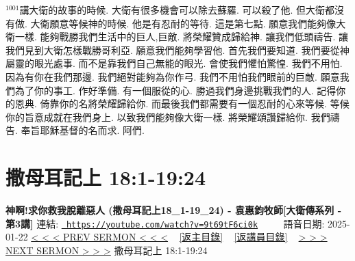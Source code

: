 \documentclass{book}
\begin{document}
$^{1001}$講大衛的故事的時候.
大衛有很多機會可以除去蘇羅.
可以殺了他.
但大衛都沒有做.
大衛願意等候神的時候.
他是有忍耐的等待.
這是第七點.
願意我們能夠像大衛一樣.
能夠戰勝我們生活中的巨人,巨敵.
將榮耀贊成歸給神.
讓我們低頭禱告.
讓我們見到大衛怎樣戰勝哥利亞.
願意我們能夠學習他.
首先我們要知道.
我們要從神屬靈的眼光處事.
而不是靠我們自己無能的眼光.
會使我們懼怕驚惶.
我們不用怕.
因為有你在我們那邊.
我們絕對能夠為你作弓.
我們不用怕我們眼前的巨敵.
願意我們為了你的事工.
作好準備.
有一個服從的心.
勝過我們身邊挑戰我們的人.
記得你的恩典.
倚靠你的名將榮耀歸給你.
而最後我們都需要有一個忍耐的心來等候.
等候你的旨意成就在我們身上.
以致我們能夠像大衛一樣.
將榮耀頌讚歸給你.
我們禱告.
奉旨耶穌基督的名而求.
阿們.
\newpage



\section{撒母耳記上 18:1-19:24}
\label{sec:9t69tF6ci0k}
\textbf{神啊!求你救我脫離惡人 (撒母耳記上18\_1-19\_24) - 袁惠鈞牧師[大衛傳系列 - 第3講]}
\newline
\newline
連結: \href{https://youtube.com/watch?v=9t69tF6ci0k}{\texttt{ https://youtube.com/watch?v=9t69tF6ci0k}} ~~~~ 語音日期: 2025-01-22 
\newline
\newline
\hyperref[sec:OtTM_EdQEtA]{< < < PREV SERMON < < <}
~
\hyperlink{toc}{[返主目錄]}
~
\hyperref[ch:preacher10]{[返講員目錄]}
~
\hyperref[sec:rN0dS2BBBmc]{> > > NEXT SERMON > > >}
\newline
\newline
撒母耳記上 18:1-19:24
\newline
\end{document}
